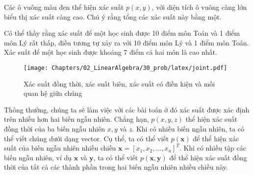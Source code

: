 Các ô vuông màu đen thể hiện xác suất $p(x, y)$, với diện tích ô vuông càng lớn
biểu thị xác suất càng cao. Chú ý rằng tổng các xác suất này bằng một.

{Có thể thấy rằng xác suất để một học sinh được 10 điểm môn Toán
và 1 điểm môn Lý rất thấp, điều tương tự xảy ra với 10 điểm môn Lý và 1 điểm môn
Toán. Xác suất để một học sinh được khoảng 7 điểm cả hai môn là cao
nhất.}



\begin{figure}[t]
\centering
    \texttt{[image: Chapters/02\_LinearAlgebra/30\_prob/latex/joint.pdf]}
    \caption[]{Xác suất đồng thời, xác suất biên, xác suất có điền kiện và mối quan hệ giữa chúng}
    \label{fig:30_1}
\end{figure}

Thông thường, chúng ta sẽ làm việc với các bài toán ở đó xác suất được xác định
trên nhiều hơn hai biến ngẫu nhiên. Chẳng hạn, $p(x, y, z)$ thể hiện xác suất
đồng thời của ba biến ngẫu nhiên $x,y$ và $z$. Khi có nhiều biến ngẫu nhiên, ta
có thể viết chúng dưới dạng vector. Cụ thể, ta có thể viết $p(\mathbf{x})$ để
thể hiện xác suất của biến ngẫu nhiên nhiều chiều $\mathbf{x} =
[x_1, x_2, \dots, x_n]^T$. Khi có nhiều tập các biến ngẫu nhiên, ví dụ
$\mathbf{x}$ và $\mathbf{y}$, ta có thể viết $p(\mathbf{x},
\mathbf{y})$ để thể hiện xác suất đồng thời của tất cả các thành phần trong
hai biến ngẫu nhiên nhiều chiều này.

